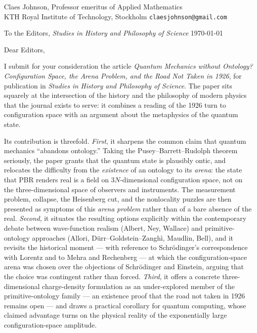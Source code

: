\documentclass[11pt]{article}
\begin{document}
\noindent
Claes Johnson, Professor emeritus of Applied Mathematics \\
KTH Royal Institute of Technology, Stockholm \quad\textbar\quad \texttt{claesjohnson@gmail.com}

\vspace{1em}

\noindent
To the Editors, \emph{Studies in History and Philosophy of Science} \hfill \today

\vspace{1em}

\noindent Dear Editors,

\medskip

I submit for your consideration the article \emph{Quantum Mechanics without Ontology? Configuration Space, the
Arena Problem, and the Road Not Taken in 1926}, for publication in \emph{Studies in History and Philosophy of
Science}. The paper sits squarely at the intersection of the history and the philosophy of modern physics that
the journal exists to serve: it combines a reading of the 1926 turn to configuration space with an argument
about the metaphysics of the quantum state.

Its contribution is threefold. \emph{First}, it sharpens the common claim that quantum mechanics ``abandons
ontology.'' Taking the Pusey--Barrett--Rudolph theorem seriously, the paper grants that the quantum state is
plausibly ontic, and relocates the difficulty from the \emph{existence} of an ontology to its \emph{arena}: the
state that PBR renders real is a field on $3N$-dimensional configuration space, not on the three-dimensional
space of observers and instruments. The measurement problem, collapse, the Heisenberg cut, and the nonlocality
puzzles are then presented as symptoms of this \emph{arena problem} rather than of a bare absence of the real.
\emph{Second}, it situates the resulting options explicitly within the contemporary debate between wave-function
realism (Albert, Ney, Wallace) and primitive-ontology approaches (Allori, D\"urr--Goldstein--Zangh\`i, Maudlin,
Bell), and it revisits the historical moment --- with reference to Schr\"odinger's correspondence with Lorentz
and to Mehra and Rechenberg --- at which the configuration-space arena was chosen over the objections of
Schr\"odinger and Einstein, arguing that the choice was contingent rather than forced. \emph{Third}, it offers a
concrete three-dimensional charge-density formulation as an under-explored member of the primitive-ontology
family --- an existence proof that the road not taken in 1926 remains open --- and draws a practical corollary
for quantum computing, whose claimed advantage turns on the physical reality of the exponentially large
configuration-space amplitude.
\end{document}
